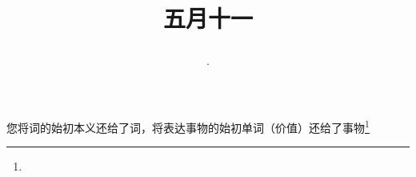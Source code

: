 \title{\date[d=16,m=6,y=2024][year:cn-y,年,month:cn,day:cn,日,·,weekday]·五月十一 }
您将词的始初本义还给了词，将表达事物的始初单词（价值）还给了事物\footnote{ }

